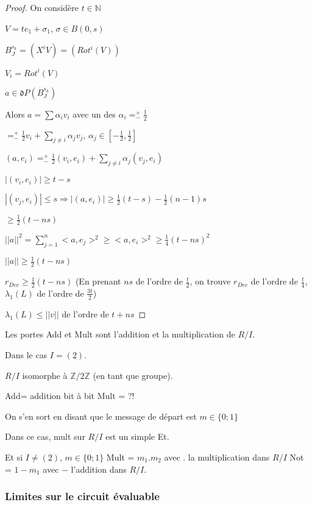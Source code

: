 \begin{proof}
On considère $t \in \mathbb{N}$

$V= t e_1 + \sigma_1$, $\sigma \in B(0,s)$

$B_J^{s_k}=(X^i V)=(Rot^i(V))$

$V_i=Rot^i(V)$

$a \in \mathfrak{d} P(B_J^{s_k})$

Alors $a=\sum \alpha_i v_i$ avec un des $\alpha_i=^+_- \frac{1}{2}$

$=^+_- \frac{1}{2} v_i + \sum_{j \neq i} \alpha_j v_j$, $\alpha_j \in [-\frac{1}{2},\frac{1}{2}]$

$(a,e_i)=^+_- \frac{1}{2}(v_i,e_i)+ \sum_{j  \neq i} \alpha_j (v_j,e_i)$

$|(v_i,e_i)| \geq t-s$ 

$|(v_j,e_i)| \leq s \Rightarrow |(a,e_i)| \geq \frac{1}{2} (t-s)- \frac{1}{2}(n-1)s$

$\geq \frac{1}{2} (t-n s)$

$||a||^2=\sum_{j=1}^n <a,e_j>^2 \geq <a,e_i>^2 \geq \frac{1}{4}(t-n s)^2$

$||a|| \geq \frac{1}{2} (t-n s)$

$r_{Dec} \geq \frac{1}{2} (t - n s)$ (En prenant $n s$ de l'ordre de $\frac{t}{2}$, on trouve $r_{Dec}$ de l'ordre de $\frac{t}{4}$, $\lambda_1(L)$ de l'ordre de $\frac{3 t}{2}$)

$\lambda_1(L) \leq ||v||$ de l'ordre de $t+ n s$
\end{proof}


Les portes Add et Mult sont l'addition et la multiplication de $R/I$.

Dans le cas $I=(2)$.

$R/I$ isomorphe à $\mathbb{Z}/2 \mathbb{Z}$ (en tant que groupe).

Add= addition bit à bit
Mult = ?!

On s'en sort en disant que le message de départ est $m \in \{0 ; 1 \}$

Dans ce cas, mult sur $R/I$ est un simple Et.

Et si $I \neq (2)$, $m \in \{ 0 ; 1 \}$
Mult = $m_1 . m_2$ avec $.$ la multiplication dans $R/I$
Not = $1-m_1$ avec $-$ l'addition dans $R/I$.

\subsubsection{Limites sur le circuit évaluable}

